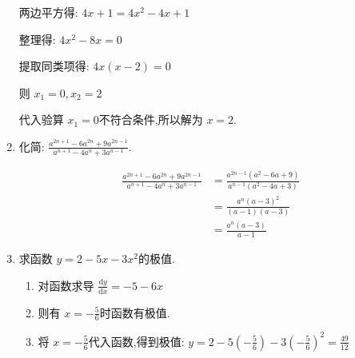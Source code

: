 \documentclass[answers]{exam}
\begin{document}
\begin{questions}
\begin{enumerate}[label=(\arabic*)]
\begin{solution}
			      两边平方得:
			      \begin{math}
				      4x + 1 = 4x^2 - 4x + 1
			      \end{math}

			      整理得:
			      \begin{math}
				      4x^2 -8x = 0
			      \end{math}

			      提取同类项得:
			      \begin{math}
				      4x(x-2) = 0
			      \end{math}

			      则
			      \begin{math}
				      x_1 = 0, x_2 = 2
			      \end{math}

			      代入验算 \( x_1 = 0  \)不符合条件,所以解为 \( x=2 \).
		      \end{solution}
		\item 化简: \( \displaystyle \frac{a^{2n+1} - 6a^{2n} + 9a^{2n-1}}{a^{n+1} - 4a^n + 3a^{n-1}} \).
		      \begin{solution}
			      \begin{align*}
				      \frac{a^{2n+1} - 6a^{2n} + 9a^{2n-1}}{a^{n+1} - 4a^n + 3a^{n-1}} & = \frac{a^{2n-1}(a^2 - 6a + 9)}{a^{n-1}(a^2-4a+3)}
				      \\
				                                                                       & = \frac{a^n(a-3)^2}{(a-1)(a-3)}
				      \\
				                                                                       & = \frac{a^n(a-3)}{a-1}
			      \end{align*}
		      \end{solution}
		\item 求函数 \( y = 2 - 5x - 3x^2 \)的极值.
		      \begin{solution}
			      \begin{enumerate}[label=\alph*.]
				      \item 对函数求导
				            \begin{math}
					            \frac{\text{d}y}{\text{d}x} = -5 - 6x
				            \end{math}
				      \item 则有 \( x = -\frac56 \)时函数有极值.
				      \item 将 \( x = -\frac56 \)代入函数,得到极值:
				            \begin{math}
					            y = 2 - 5(-\frac56) - 3(-\frac56)^2 = \frac{49}{12}
				            \end{math}


\end{enumerate}
\end{solution}
\end{enumerate}
\end{questions}
\end{document}
